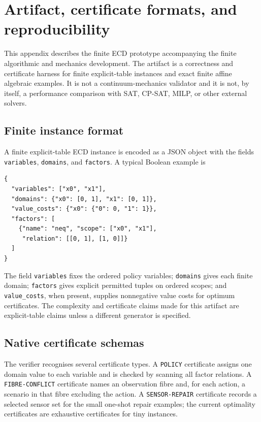 \appendix
\section{Artifact, certificate formats, and reproducibility}
\label{app:artifact}

This appendix describes the finite ECD prototype accompanying the finite
algorithmic and mechanics development. The artifact is a correctness and
certificate harness for finite explicit-table instances and exact finite affine
algebraic examples. It is not a continuum-mechanics validator and it is not, by
itself, a performance comparison with SAT, CP-SAT, MILP, or other external
solvers.

\subsection{Finite instance format}

A finite explicit-table ECD instance is encoded as a JSON object with the fields
\texttt{variables}, \texttt{domains}, and \texttt{factors}. A typical Boolean
example is
\begin{verbatim}
{
  "variables": ["x0", "x1"],
  "domains": {"x0": [0, 1], "x1": [0, 1]},
  "value_costs": {"x0": {"0": 0, "1": 1}},
  "factors": [
    {"name": "neq", "scope": ["x0", "x1"],
     "relation": [[0, 1], [1, 0]]}
  ]
}
\end{verbatim}
The field \texttt{variables} fixes the ordered policy variables; \texttt{domains}
gives each finite domain; \texttt{factors} gives explicit permitted tuples on
ordered scopes; and \texttt{value\_costs}, when present, supplies nonnegative
value costs for optimum certificates. The complexity and certificate claims made
for this artifact are explicit-table claims unless a different generator is
specified.

\subsection{Native certificate schemas}

The verifier recognises several certificate types. A \texttt{POLICY} certificate
assigns one domain value to each variable and is checked by scanning all factor
relations. A \texttt{FIBRE-CONFLICT} certificate names an observation fibre and,
for each action, a scenario in that fibre excluding the action. A
\texttt{SENSOR-REPAIR} certificate records a selected sensor set for the small
one-shot repair examples; the current optimality certificates are exhaustive
certificates for tiny instances.

